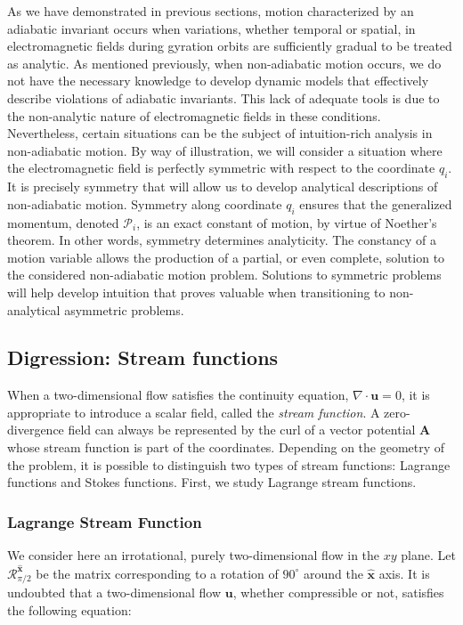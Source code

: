As we have demonstrated in previous sections, motion characterized by an adiabatic invariant occurs when variations, whether temporal or spatial, in electromagnetic fields during gyration orbits are sufficiently gradual to be treated as analytic. As mentioned previously, when non-adiabatic motion occurs, we do not have the necessary knowledge to develop dynamic models that effectively describe violations of adiabatic invariants. This lack of adequate tools is due to the non-analytic nature of electromagnetic fields in these conditions. Nevertheless, certain situations can be the subject of intuition-rich analysis in non-adiabatic motion. By way of illustration, we will consider a situation where the electromagnetic field is perfectly symmetric with respect to the coordinate $q_i$. It is precisely symmetry that will allow us to develop analytical descriptions of non-adiabatic motion. Symmetry along coordinate $q_i$ ensures that the generalized momentum, denoted $\mathcal{P}_i$, is an exact constant of motion, by virtue of Noether's theorem. In other words, symmetry determines analyticity. The constancy of a motion variable allows the production of a partial, or even complete, solution to the considered non-adiabatic motion problem. Solutions to symmetric problems will help develop intuition that proves valuable when transitioning to non-analytical asymmetric problems.

\subsection{Digression: Stream functions}

When a two-dimensional flow satisfies the continuity equation, $\nabla\cdot\mathbf{u}=0$, it is appropriate to introduce a scalar field, called the \textit{stream function}. A zero-divergence field can always be represented by the curl of a vector potential $\mathbf{A}$ whose stream function is part of the coordinates. Depending on the geometry of the problem, it is possible to distinguish two types of stream functions: Lagrange functions and Stokes functions. First, we study Lagrange stream functions.

\subsubsection{Lagrange Stream Function}

We consider here an irrotational, purely two-dimensional flow in the $xy$ plane. Let $\mathcal{R}^\mathbf{\hat{x}}_{\pi/2}$ be the matrix corresponding to a rotation of $90^\circ$ around the $\mathbf{\hat{x}}$ axis. It is undoubted that a two-dimensional flow $\mathbf{u}$, whether compressible or not, satisfies the following equation:

